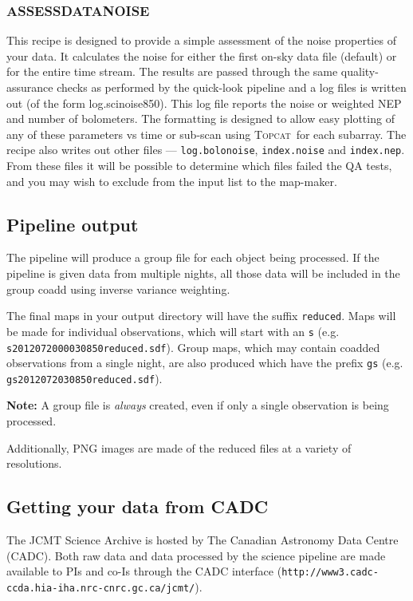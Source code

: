 \documentclass[twoside,11pt]{article}
\newcommand{\htmladdnormallink}[2]{#1}
\newcommand{\xlabel}[1]{}
\renewcommand{\_}{\texttt{\symbol{95}}}
\newcommand{\topcat}{\htmladdnormallink{\textsc{Topcat}}{http://www.starlink.ac.uk/topcat}}
\begin{document}
\subsubsection{\xlabel{assessnoise}ASSESS\_DATA\_NOISE}

This recipe is designed to provide a simple assessment of the noise
properties of your data. It calculates the noise for either the first
on-sky data file (default) or for the entire time stream. The results
are passed through the same quality-assurance checks as performed by
the quick-look pipeline and a log files is written out (of the form
log.scinoise850). This log file reports the noise or weighted NEP and
number of bolometers. The formatting is designed to allow easy
plotting of any of these parameters vs time or sub-scan using \topcat\
for each subarray. The recipe also writes out other files ---
\texttt{log.bolonoise}, \texttt{index.noise} and \texttt{index.nep}.
From these files it will be possible to determine which files failed
the QA tests, and you may wish to exclude from the input list to the
map-maker.

\subsection{\xlabel{pl_output}Pipeline output}

The pipeline will produce a group file for each object being
processed. If the pipeline is given data from multiple nights, all
those data will be included in the group coadd using inverse variance
weighting.

The final maps in your output directory will have the suffix
\texttt{\_reduced}. Maps will be made for individual observations,
which will start with an \texttt{s} (e.g.
\texttt{s20120720\_00030\_850\_reduced.sdf}). Group maps, which may contain
coadded observations from a single night, are also produced which
have the prefix \texttt{gs} (e.g. \texttt{gs20120720\_30\_850\_reduced.sdf}).

\textbf{Note:} A group file is \emph{always} created, even if only a single
observation is being processed.

Additionally, PNG images are made of the reduced files at a variety of
resolutions.

\subsection{\xlabel{cadc}Getting your data from CADC}

The JCMT Science Archive is hosted by The Canadian Astronomy Data
Centre (CADC). Both raw data and data processed by the science pipeline
are made available to PIs and co-Is through the CADC interface
(\texttt{http://www3.cadc-ccda.hia-iha.nrc-cnrc.gc.ca/jcmt/}).
\end{document}
